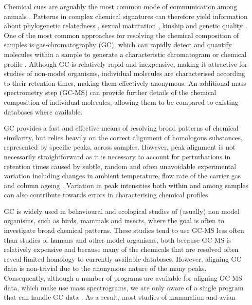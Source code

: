 Chemical cues are arguably the most common mode of communication among
animals \citep{Wyatt.2014}. Patterns in complex chemical signatures can
therefore yield information about phylogenetic relatedness
\citep{Meulemeester.2011}, sexual maturation \citep{Caspers.2011},
kinship \citep{Bonadonna.2012, Krause.2012, Stoffel.2015} and genetic
quality \citep{Charpentier.2010, Leclaire.2012, Stoffel.2015}. One of
the most common approaches for resolving the chemical composition of
samples is gas-chromatography (GC), which can rapidly detect and
quantify molecules within a sample to generate a characteristic
chromatogram or chemical profile \citep{McNair.2011}. Although GC is
relatively rapid and inexpensive, making it attractive for studies of
non-model organisms, individual molecules are characterised according to
their retention times, making them effectively anonymous. An additional
mass-spectrometry step (GC-MS) can provide further details of the
chemical composition of individual molecules, allowing them to be
compared to existing databases where available. \par
GC provides a fast and effective means of resolving broad patterns of
chemical similarity, but relies heavily on the correct alignment of
homologous substances, represented by specific peaks, across samples.
However, peak alignment is not necessarily straightforward as it is
necessary to account for perturbations in retention times caused by
subtle, random and often unavoidable experimental variation including
changes in ambient temperature, flow rate of the carrier gas and column
ageing \citep{Scott.2003, Pierce.2005}. Variation in peak intensities
both within and among samples can also contribute towards errors in
characterising chemical profiles. \par
GC is widely used in behavioural and ecological studies of (usually) non
model organisms, such as birds, mammals and insects, where the goal is
often to investigate broad chemical patterns. These studies tend to use
GC-MS less often than studies of humans and other model organisms, both
because GC-MS is relatively expensive and because many of the chemicals
that are resolved often reveal limited homology to currently available
databases. However, aligning GC data is non-trivial due to the anonymous
nature of the many peaks. Consequently, although a number of programs
are available for aligning GC-MS data, which make use mass spectrograms,
we are only aware of a single program that can handle GC data
\citep{Dellicour.2013}. As a result, most studies of mammalian and avian

